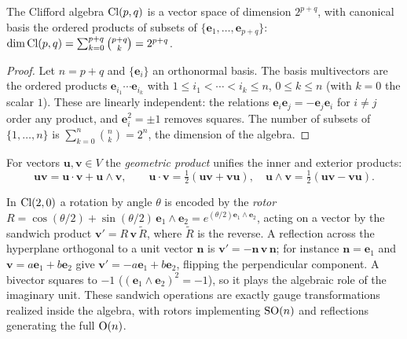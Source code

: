 \begin{theorem}
\label{thm:gauge:clifford-dim}
The Clifford algebra $\operatorname{Cl}(p, q)$ is a vector space of dimension $2^{p+q}$, with
canonical basis the ordered products of subsets of
$\{\mathbf{e}_1, \ldots, \mathbf{e}_{p+q}\}$:
$\dim \operatorname{Cl}(p,q) = \sum_{k=0}^{p+q} \binom{p+q}{k} = 2^{p+q}$.
\end{theorem}

\begin{proof}
Let $n = p+q$ and $\{\mathbf{e}_i\}$ an orthonormal basis. The basis multivectors
are the ordered products $\mathbf{e}_{i_1}\cdots\mathbf{e}_{i_k}$ with
$1 \le i_1 < \cdots < i_k \le n$, $0 \le k \le n$ (with $k=0$ the scalar $1$).
These are linearly independent: the relations $\mathbf{e}_i\mathbf{e}_j =
-\mathbf{e}_j\mathbf{e}_i$ for $i \neq j$ order any product, and
$\mathbf{e}_i^2 = \pm 1$ removes squares. The number of subsets of $\{1, \ldots,
n\}$ is $\sum_{k=0}^{n}\binom{n}{k} = 2^n$, the dimension of the algebra.
\end{proof}

\begin{definition}
\label{def:gauge:geometric-product}
For vectors $\mathbf{u}, \mathbf{v} \in V$ the \emph{geometric product} unifies
the inner and exterior products:
\[
  \mathbf{u}\mathbf{v} = \mathbf{u}\cdot\mathbf{v} + \mathbf{u}\wedge\mathbf{v},
  \qquad
  \mathbf{u}\cdot\mathbf{v} = \tfrac{1}{2}(\mathbf{u}\mathbf{v} +
  \mathbf{v}\mathbf{u}),
  \quad
  \mathbf{u}\wedge\mathbf{v} = \tfrac{1}{2}(\mathbf{u}\mathbf{v} -
  \mathbf{v}\mathbf{u}).
\]
\end{definition}

\begin{example}
\label{ex:gauge:rotors}
In $\operatorname{Cl}(2,0)$ a rotation by angle $\theta$ is encoded by the \emph{rotor}
$R = \cos(\theta/2) + \sin(\theta/2)\,\mathbf{e}_1\wedge\mathbf{e}_2 =
e^{(\theta/2)\mathbf{e}_1\wedge\mathbf{e}_2}$, acting on a vector by the sandwich
product $\mathbf{v}' = R\,\mathbf{v}\,\widetilde{R}$, where $\widetilde{R}$ is the
reverse. A reflection across the hyperplane orthogonal to a unit vector
$\mathbf{n}$ is $\mathbf{v}' = -\mathbf{n}\,\mathbf{v}\,\mathbf{n}$; for instance
$\mathbf{n} = \mathbf{e}_1$ and $\mathbf{v} = a\mathbf{e}_1 + b\mathbf{e}_2$ give
$\mathbf{v}' = -a\mathbf{e}_1 + b\mathbf{e}_2$, flipping the perpendicular
component. A bivector squares to $-1$
($(\mathbf{e}_1\wedge\mathbf{e}_2)^2 = -1$), so it plays the algebraic role of the
imaginary unit. These sandwich operations are exactly gauge transformations
realized inside the algebra, with rotors implementing $\operatorname{SO}(n)$ and reflections
generating the full $\operatorname{O}(n)$.
\end{example}

